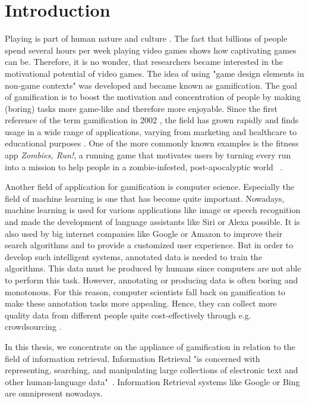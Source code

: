 \chapter{Introduction}
Playing is part of human nature and culture \cite{huizinga}. The fact that billions of people spend several hours per week playing video games \cite{gameStatistics, numberGamers} shows how captivating games can be.
Therefore, it is no wonder, that researchers became interested in the motivational potential of video games. The idea of using "game design elements in non-game contexts" \cite{gamificationDefinition} was developed and became known as gamification. The goal of gamification is to boost the motivation and concentration of people by making (boring) tasks more game-like and therefore more enjoyable. Since the first reference of the term gamification in 2002 \cite{wirkungGamificationBuch}, the field has grown rapidly and finds usage in a wide range of applications, varying from marketing and healthcare to educational purposes \cite{ actionableGamification, gamificationExamples, gamificationHealthcareExample, gamificationHealthcareExample2}.
One of the more commonly known examples is the fitness app \textit{Zombies, Run!}, a running game that motivates users by turning every run into a mission to help people in a zombie-infested, post-apocalyptic world~ \cite{zombies}. \par
Another field of application for gamification is computer science. Especially the field of machine learning is one that has become quite important. Nowadays, machine learning is used for various applications like image or speech recognition and made the development of language assistants like Siri or Alexa possible. It is also used by big internet companies like Google or Amazon to improve their search algorithms and to provide a customized user experience. But in order to develop such intelligent systems, annotated data is needed to train the algorithms. This data must be produced by humans since computers are not able to perform this task. However, annotating or producing data is often boring and monotonous.
For this reason, computer scientists fall back on gamification to make these annotation tasks more appealing. Hence, they can collect more quality data from different people quite cost-effectively through e.g. crowdsourcing \cite{moneytaryBenefits}. \par
In this thesis, we concentrate on the appliance of gamification in relation to the field of information retrieval. Information Retrieval "is concerned with representing, searching, and manipulating large collections of electronic text and other human-language data"~\cite{informationRetrieval}. Information Retrieval systems like Google or Bing are omnipresent nowadays.
